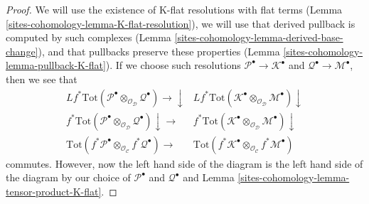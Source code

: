 \begin{proof}
We will use the existence of K-flat resolutions with flat terms
(Lemma \ref{sites-cohomology-lemma-K-flat-resolution}), we will use that derived pullback
is computed by such complexes (Lemma \ref{sites-cohomology-lemma-derived-base-change}),
and that pullbacks preserve these properties
(Lemma \ref{sites-cohomology-lemma-pullback-K-flat}). If we choose such
resolutions $\mathcal{P}^\bullet \to \mathcal{K}^\bullet$
and $\mathcal{Q}^\bullet \to \mathcal{M}^\bullet$, then
we see that
$$
\begin{array}{cc}Lf^*\text{Tot}(\mathcal{P}^\bullet
\otimes_{\mathcal{O}_\mathcal{D}}
\mathcal{Q}^\bullet) \longrightarrow\downarrow & Lf^*\text{Tot}(\mathcal{K}^\bullet
\otimes_{\mathcal{O}_\mathcal{D}}
\mathcal{M}^\bullet) \downarrow \\ f^*\text{Tot}(\mathcal{P}^\bullet
\otimes_{\mathcal{O}_\mathcal{D}}
\mathcal{Q}^\bullet) \downarrow\longrightarrow & f^*\text{Tot}(\mathcal{K}^\bullet
\otimes_{\mathcal{O}_\mathcal{D}}
\mathcal{M}^\bullet) \downarrow \\ \text{Tot}(f^*\mathcal{P}^\bullet \otimes_{\mathcal{O}_\mathcal{C}}
f^*\mathcal{Q}^\bullet) \longrightarrow & \text{Tot}(f^*\mathcal{K}^\bullet \otimes_{\mathcal{O}_\mathcal{C}}
f^*\mathcal{M}^\bullet)\end{array}
$$
commutes. However, now the left hand side of the diagram
is the left hand side of the diagram by our choice of
$\mathcal{P}^\bullet$ and $\mathcal{Q}^\bullet$ and
Lemma \ref{sites-cohomology-lemma-tensor-product-K-flat}.
\end{proof}

